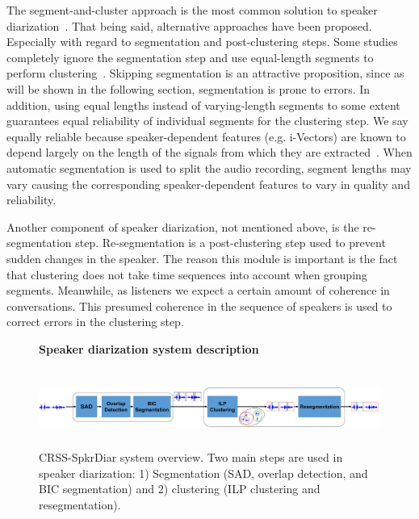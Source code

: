 The segment-and-cluster approach is the most common solution to speaker diarization~\cite{meignier2010lium,anguera2012diarization}. 
That being said, alternative approaches have been proposed. 
Especially with regard to segmentation and post-clustering steps. 
Some studies completely ignore the segmentation step and use equal-length segments to perform clustering~\cite{sell_garcia_2015diarization}. 
Skipping segmentation is an attractive proposition, since as will be shown in the following section, segmentation is prone to errors. 
In addition, using equal lengths instead of varying-length segments to some extent guarantees equal reliability of individual segments for the clustering step. 
We say equally reliable because speaker-dependent features (e.g. i-Vectors) are known to depend largely on the length of the signals from which they are extracted~\cite{hasan2013duration}. 
When automatic segmentation is used to split the audio recording, segment lengths may vary causing the corresponding speaker-dependent features to vary in quality and reliability. 

Another component of speaker diarization, not mentioned above, is the re-segmentation step. 
Re-segmentation is a post-clustering step used to prevent sudden changes in the speaker. 
The reason this module is important is the fact that clustering does not take time sequences into account when grouping segments. 
Meanwhile, as listeners we expect a certain amount of coherence in conversations. 
This presumed coherence in the sequence of speakers is used to correct errors in the clustering step. 

\begin{figure}[t!]
	\centering
	\textbf{Speaker diarization system description}\par\medskip
	\includegraphics[height = 1in, width=1\textwidth]{figures/crssdiar_outline}
	\caption{ \small CRSS-SpkrDiar system overview. Two main steps are used in speaker diarization: 1) Segmentation (SAD, overlap detection, and BIC segmentation) and 2) clustering (ILP clustering and resegmentation). }
	\label{fig:ch5_crssdiar}
	\vspace{-3mm}
\end{figure}


